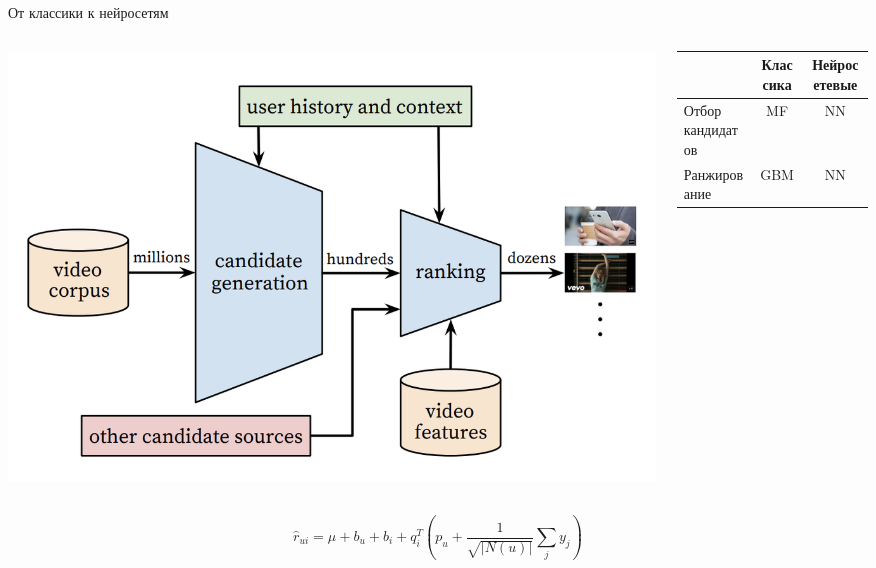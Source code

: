 \documentclass[11pt,aspectratio=169]{beamer}
\begin{document}
\begin{frame}{От классики к нейросетям}

\begin{columns}
\begin{column}{0.4\textwidth} 
\begin{center}
\includegraphics[scale=0.3]{images/youtube-arch.png}
\end{center}
\end{column}
\begin{column}{0.5\textwidth}

\begin{small}
\begin{tabular}{l c c}
 & Классика & Нейросетевые \\
\hline
Отбор кандидатов & MF & NN \\
Ранжирование & GBM & NN
\end{tabular}
\end{small}

\end{column}
\end{columns}

\end{frame}

\begin{frame}

\begin{tcolorbox}[colback=info!5,colframe=info!80,title=SVD++]
\[
\hat r_{ui} = \mu + b_u + b_i + q_i^T \left( p_u + \frac{1}{\sqrt{|N(u)|}} \sum_j y_j \right)
\]
\end{tcolorbox}

\end{frame}
\end{document}
